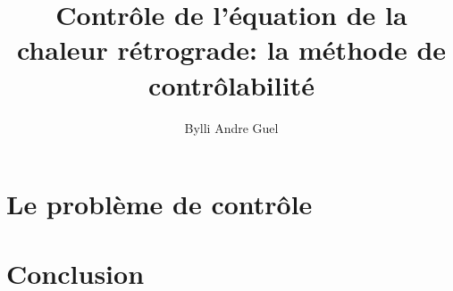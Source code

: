 \documentclass[a4paper,12pt]{article}
\author{Bylli Andre Guel}
\title{Contrôle de l'équation de la chaleur rétrograde: la méthode de
contrôlabilité}
\begin{document}
\parindent=0pt{}
\parskip=6pt{}

\maketitle{}




\section{Le problème de contrôle}

\section{Conclusion}

\nocite{*}
\printbibliography{}
\end{document}
